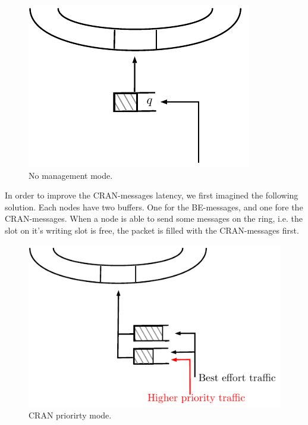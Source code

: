 \documentclass[a4paper,10pt]{article}
\begin{document}
    \begin{figure}[h!]
\begin{center}   

      \includegraphics[scale=0.7]{insertion0.pdf}

     \caption{No management mode.}
\end{center}
  \end{figure}
  
  In order to improve the CRAN-messages latency, we first imagined the following solution. Each nodes have two buffers. One for the BE-messages, and one fore the CRAN-messages. When a node is able to send some messages on the ring, i.e. the slot on it's writing slot is free, the packet is filled with the CRAN-messages first. 
  
  
    \begin{figure}[h!]
\begin{center}   

      \includegraphics[scale=0.7]{insertion1.pdf}

     \caption{CRAN priorirty mode.}
\end{center}
  \end{figure}
  
\end{document}
